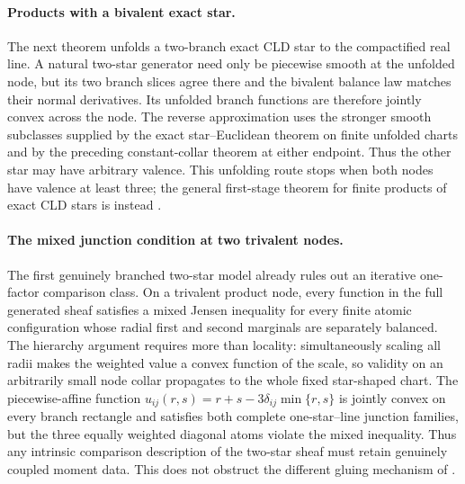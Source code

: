 \paragraph{Products with a bivalent exact star.}
The next theorem unfolds a two-branch exact CLD star to the compactified
real line.  A natural two-star generator need only be piecewise smooth at
the unfolded node, but its two branch slices agree there and the bivalent
balance law matches their normal derivatives.  Its unfolded branch
functions are therefore jointly convex across the node.  The reverse
approximation uses the stronger smooth subclasses supplied by the exact
star--Euclidean theorem on finite unfolded charts and by the preceding
constant-collar theorem at either endpoint.  Thus the other star may have
arbitrary valence.  This unfolding route stops when both nodes have valence
at least three; the general first-stage theorem for finite products of exact
CLD stars is instead .




\paragraph{The mixed junction condition at two trivalent nodes.}
The first genuinely branched two-star model already rules out an iterative
one-factor comparison class.  On a trivalent product node, every function
in the full generated sheaf satisfies a mixed Jensen inequality for every
finite atomic configuration whose radial first and second marginals are
separately balanced.  The hierarchy argument requires more than locality:
simultaneously scaling all radii makes the weighted value a convex function
of the scale, so validity on an arbitrarily small node collar propagates to
the whole fixed star-shaped chart.  The piecewise-affine function
$u_{ij}(r,s)=r+s-3\delta_{ij}\min\{r,s\}$ is jointly convex on every branch
rectangle and satisfies both complete one-star--line junction families, but
the three equally weighted diagonal atoms violate the mixed inequality.
Thus any intrinsic comparison description of the two-star sheaf must retain
genuinely coupled moment data.  This does not obstruct the different gluing
mechanism of .




